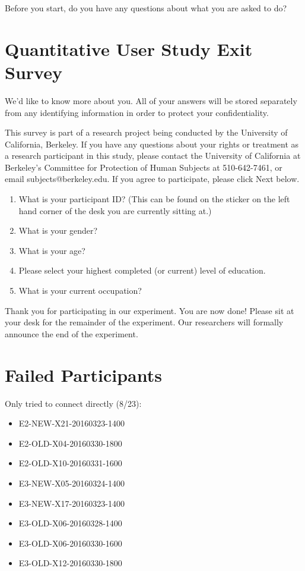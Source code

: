 \documentclass[USenglish,oneside,twocolumn]{article}
\begin{document}
Before you start, do you have any questions about what you are asked to do? 

\section{Quantitative User Study Exit Survey} 
\label{quantitative-exit-survey}
We'd like to know more about you.  All of your answers will be stored separately from any identifying information in order to protect your confidentiality.

This survey is part of a research project being conducted by the University of California, Berkeley. If you have any questions about your rights or treatment as a research participant in this study, please contact the University of California at Berkeley's Committee for Protection of Human Subjects at 510-642-7461, or email subjects@berkeley.edu. If you agree to participate, please click Next below.\\

\begin{enumerate}
\item{What is your participant ID? (This can be found on the sticker on the left hand corner of the desk you are currently sitting at.)}
\item{What is your gender?}
\item{What is your age?}
\item{Please select your highest completed (or current) level of education}.
\item{What is your current occupation?}  
\end{enumerate}

Thank you for participating in our experiment. You are now done! Please sit at your desk for the remainder of the experiment. Our researchers will formally announce the end of the experiment. 

\section{Failed Participants} 
\label{failed-participants}

Only tried to connect directly (8/23): 
\begin{itemize}
\item E2-NEW-X21-20160323-1400
\item E2-OLD-X04-20160330-1800
\item E2-OLD-X10-20160331-1600
\item E3-NEW-X05-20160324-1400
\item E3-NEW-X17-20160323-1400
\item E3-OLD-X06-20160328-1400
\item E3-OLD-X06-20160330-1600
\item E3-OLD-X12-20160330-1800
\end{itemize} 
\end{document}
